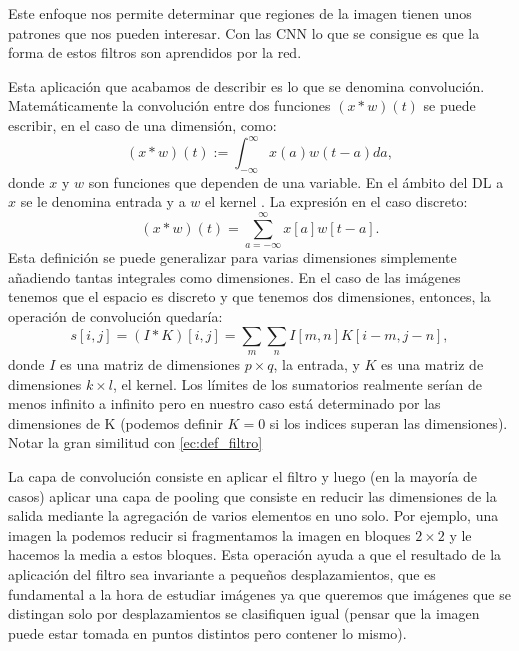 \documentclass[a4paper,12pt,twoside,titlepage]{article}
\begin{document}
Este enfoque nos permite determinar que regiones de la imagen tienen unos patrones que nos pueden interesar. Con las CNN lo que se consigue es que la forma de estos filtros son aprendidos por la red. 

Esta aplicación que acabamos de describir es lo que se denomina convolución. Matemáticamente la convolución entre dos funciones $(x * w)(t)$ se puede escribir, en el caso de una dimensión, como:
\begin{equation}
  (x * w)(t):=\int_{-\infty}^{\infty} x(a) w(t-a) d a,
\end{equation}
donde $x$ y $w$ son funciones que dependen de una variable. En el ámbito del DL a $x$ se le denomina entrada y a $w$ el kernel \cite{dl_book}. La expresión en el caso discreto:
\begin{equation}
  (x * w)(t)=\sum_{a=-\infty}^{\infty} x[a] w[t-a].
  \end{equation}
Esta definición se puede generalizar para varias dimensiones simplemente añadiendo tantas integrales como dimensiones. En el caso de las imágenes tenemos que el espacio es discreto y que tenemos dos dimensiones, entonces, la operación de convolución quedaría:
\begin{equation}
  s[i, j]=(I * K)[i, j]=\sum_{m} \sum_{n} I[m, n] K[i-m, j-n],
\end{equation}
donde $I$ es una matriz de dimensiones $p\times q$, la entrada, y $K$ es una matriz de dimensiones $k\times l$, el kernel. Los límites de los sumatorios realmente serían de menos infinito a infinito pero en nuestro caso está determinado por las dimensiones de K (podemos definir $K = 0$ si los indices superan las dimensiones). Notar la gran similitud con \ref{ec:def_filtro}


La capa de convolución consiste en aplicar el filtro y luego (en la mayoría de casos) aplicar una capa de pooling que consiste en reducir las dimensiones de la salida mediante la agregación de varios elementos en uno solo. Por ejemplo, una imagen la podemos reducir si fragmentamos la imagen en bloques $2\times 2$ y le hacemos la media a estos bloques. Esta operación ayuda a que el resultado de la aplicación del filtro sea invariante a pequeños desplazamientos, que es fundamental a la hora de estudiar imágenes ya que queremos que imágenes que se distingan solo por desplazamientos se clasifiquen igual (pensar que la imagen puede estar tomada en puntos distintos pero contener lo mismo).
\end{document}
